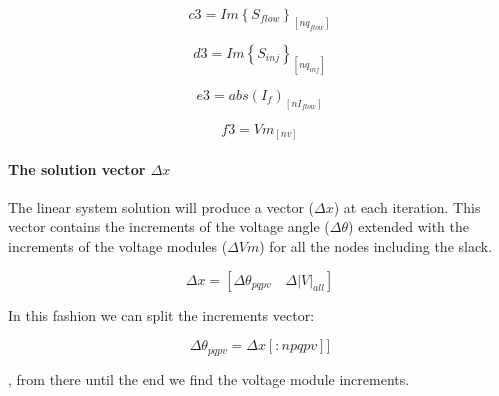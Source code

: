\documentclass[nols,a4paper,twoside,notoc,fleqn]{tufte-book}
\begin{document}
\begin{equation}
c3 = Im\left\{S_{flow}\right\}_{[nq_{flow}]}
\end{equation}



\begin{equation}
d3 = Im\left\{S_{inj}\right\}_{[nq_{inj}]}
\end{equation}



\begin{equation}
e3 = abs\left(I_f\right)_{[nI_{flow}]}
\end{equation}


\begin{equation}
f3 = Vm_{[nv]}
\end{equation}



\paragraph{The solution vector $\Delta x$}

The linear system solution will produce a vector ($\Delta x$) at each iteration. This vector contains the increments of the voltage angle ($\Delta \theta$) extended with the increments of the voltage modules ($\Delta Vm$) for all the nodes including the slack.

\begin{equation}
\Delta {x} = [ \Delta \theta_{pqpv} \quad \Delta|{V}|_{all} ]
\end{equation}

In this fashion we can split the increments vector:

\begin{equation}
\Delta \theta_{pqpv} = \Delta {x}[:npqpv]]
\end{equation}

, from there until the end we find the voltage module increments.
\end{document}

